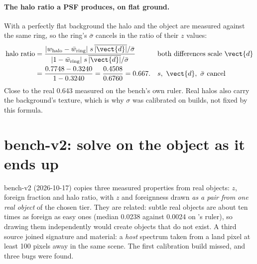\paragraph{The halo ratio a PSF produces, on flat ground.} With a perfectly flat background the halo and the object
are measured against the same ring, so the ring's $\bar\sigma$ cancels in the ratio of their $z$ values:
\begin{align*}
\text{halo ratio} &= \frac{|w_{\text{halo}} - \bar w_{\text{ring}}|\; s\,\overline{|\vect{d}|}/\bar\sigma}
                         {|1 - \bar w_{\text{ring}}|\; s\,\overline{|\vect{d}|}/\bar\sigma}
  && \text{both differences scale } \vect{d}\\
&= \frac{0.7748 - 0.3240}{1 - 0.3240} = \frac{0.4508}{0.6760} = 0.667. && s,\ \vect{d},\ \bar\sigma \text{ cancel}
\end{align*}
Close to the real 0.643 measured on the bench's own ruler. Real halos also carry the background's texture, which is
why $\sigma$ was calibrated on builds, not fixed by this formula.

\section{bench-v2: solve on the object as it ends up}\label{sec:benchmarks:v2}

bench-v2 (2026-10-17) copies three measured properties from real objects: $z$, foreign fraction and halo ratio, with
$z$ and foreignness drawn \emph{as a pair from one real object} of the chosen tier. They are related: subtle real
objects are about ten times as foreign as easy ones (median 0.0238 against 0.0024 on 's
ruler\hfil{}\hfilneg{}), so drawing them independently would create objects
that do not exist. A third source joined signature and material: a \emph{host} spectrum taken from a land pixel at
least 100 pixels away in the same scene. The first calibration build missed, and three bugs were found.

